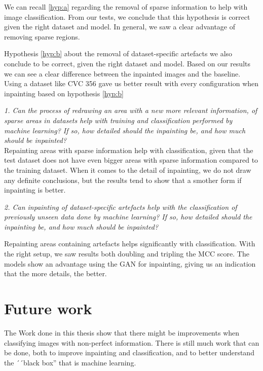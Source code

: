 We can recall \ref{hyp:a} regarding the removal of sparse information to help with image classification. From our tests, we conclude that this hypothesis is correct given the right dataset and model. 
In general, we saw a clear advantage of removing sparse regions. 

Hypothesis \ref{hyp:b} about the removal of dataset-specific artefacts we also conclude to be correct, given the right dataset and model. 
Based on our results we can see a clear difference between the inpainted images and the baseline. 
Using a dataset like CVC 356 gave us better result with every configuration when inpainting based on hypothesis \ref{hyp:b}

\noindent \textit{1. Can the process of redrawing an area with a new more relevant information, of sparse areas in datasets help with training and classification performed by machine learning? If so, how detailed should the inpainting be, and how much should be inpainted?}\\

Repainting areas with sparse information help with classification, given that the test dataset does not have even bigger areas with sparse information compared to the training dataset. When it comes to the detail of inpainting, we do not draw any definite conclusions, but the results tend to show that a smother form if inpainting is better.




\noindent \textit{2. Can inpainting of dataset-specific artefacts help with the classification of previously unseen data done by machine learning? If so, how detailed should the inpainting be, and how much should be inpainted?}

Repainting areas containing artefacts helps significantly with classification. With the right setup, we saw results both doubling and tripling the MCC score. The models show an advantage using the GAN for inpainting, giving us an indication that the more details, the better. 



\section{Future work}
The Work done in this thesis show that there might be improvements when classifying images with non-perfect information. There is still much work that can be done, both to improve inpainting and classification, and to better understand the ´´black box'' that is machine learning. 

